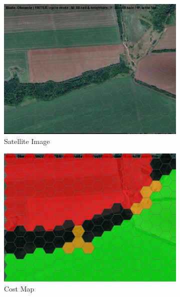 \begin{figure}[htbp]
  \centering
  \begin{subfigure}[b]{0.32\textwidth}
    \includegraphics[width=\textwidth]{figs/Thomas/Return To Safety/50.19.27.N 36.55.32.E.png}
    \caption{Satellite Image}
    \label{fig:cost map satellite}
  \end{subfigure}
  \hfill
  \begin{subfigure}[b]{0.32\textwidth}
    \includegraphics[width=\textwidth]{figs/Thomas/Return To Safety/50.19.27.N 36.55.32.E Cost.png}
    \caption{Cost Map}
    \label{fig:cost map cost}
  \end{subfigure}
  \hfill
  \begin{subfigure}[b]{0.32\textwidth}

\end{subfigure}
\end{figure}

